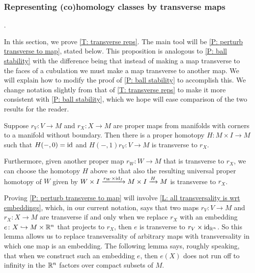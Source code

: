 \begin{comment}
NEED TO PULL THIS OUT

The arguments of the proof of \cref{T: (co)homology products} also demonstrate the following important theorem:



\greg{Once this section is edited and fixed up, we need to pull out a theorem that says that given $W$, (1) any cocycle can be represented by a pre(co)chain $V$ transverse to $W$ and (2) given such a cocycle transverse to $W$ that bounds, we can cobound it with something transverse to $W$. For sketch of proof, see comment after this note marker
}
\end{comment}


\subsubsection{Representing (co)homology classes by transverse maps}\label{S: transverse maps}.

In this section, we prove \cref{T: transverse reps}.
The main tool will be \cref{P: perturb transverse to map}, stated below.
This proposition is analogous to \cref{P: ball stability} with the difference being that instead of making a map transverse to the faces of a cubulation we must make a map transverse to another map.
We will explain how to modify the proof of \cref{P: ball stability} to accomplish this.
We change notation slightly from that of \cref{T: transverse reps} to make it more consistent with \cref{P: ball stability}, which we hope will ease comparison of the two results for the reader.

\begin{proposition}\label{P: perturb transverse to map}
	Suppose $r_V \colon V \to M$ and $r_X \colon X \to M$ are proper maps from manifolds with corners to a manifold without boundary.
	Then there is a proper homotopy $H \colon M \times I \to M$ such that $H(-,0) = \mathrm{id}$ and $H(-,1)r_V \colon V \to M$ is transverse to $r_X$.

	Furthermore, given another proper map $r_W \colon W \to M$ that is transverse to $r_X$, we can choose the homotopy $H$ above so that also the resulting universal proper homotopy of $W$ given by $W \times I \xrightarrow{r_W \times \mathrm{id}_I} M \times I \xrightarrow{H} M$ is transverse to $r_X$.
\end{proposition}

Proving \cref{P: perturb transverse to map} will involve \cref{L: all transversality is wrt embeddings}, which, in our current notation, says that two maps $r_V \colon V \to M$ and $r_X \colon X \to M$ are transverse if and only when we replace $r_X$ with an embedding $e \colon X \hookrightarrow M \times \mathbb{R}^n$ that projects to $r_X$, then $e$ is transverse to $r_V \times \mathrm{id}_{\mathbb{R}^n}$.
So this lemma allows us to replace transversality of arbitrary maps with transversality in which one map is an embedding.
The following lemma says, roughly speaking, that when we construct such an embedding $e$, then $e(X)$ does not run off to infinity in the $\mathbb{R}^n$ factors over compact subsets of $M$.

